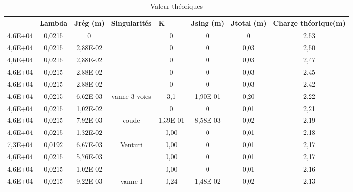 \documentclass[12pt, a4paper, twoside]{article} %
\begin{document}
\begin{landscape}
\centering
\begin{table}[h]
  \centering
  \caption{Valeur théoriques}
    \begin{tabular}{|c|c|c|c|c|c|c|c|}
    \hline
   \rowcolor[rgb]{ 1,  1,  0} \multicolumn{1}{|l|}{Re} & \multicolumn{1}{l|}{Lambda} & \multicolumn{1}{l|}{Jrég (m)} & Singularités & \multicolumn{1}{l|}{K} & \multicolumn{1}{l|}{Jsing (m)} & \multicolumn{1}{l|}{Jtotal (m)} & \multicolumn{1}{l|}{Charge théorique(m)} \\
    \hline
    4,6E+04 & 0,0215 & 0      & \cellcolor[rgb]{ .576,  .769,  .49} & 0      & 0      & 0      & 2,53 \\
    \hline
    4,6E+04 & 0,0215 & 2,88E-02 & \cellcolor[rgb]{ .576,  .769,  .49} & 0      & 0      & 0,03   & 2,50 \\
    \hline
    4,6E+04 & 0,0215 & 2,88E-02 & \cellcolor[rgb]{ .576,  .769,  .49} & 0      & 0      & 0,03   & 2,47 \\
    \hline
    4,6E+04 & 0,0215 & 2,88E-02 & \cellcolor[rgb]{ .576,  .769,  .49} & 0      & 0      & 0,03   & 2,45 \\
    \hline
    4,6E+04 & 0,0215 & 2,88E-02 & \cellcolor[rgb]{ .576,  .769,  .49} & 0      & 0      & 0,03   & 2,42 \\
    \hline
    4,6E+04 & 0,0215 & 6,62E-03 & \cellcolor[rgb]{ .576,  .769,  .49}vanne 3 voies & 3,1    & 1,90E-01 & 0,20   & 2,22 \\
    \hline
    4,6E+04 & 0,0215 & 1,02E-02 & \cellcolor[rgb]{ .576,  .769,  .49} & 0      & 0      & 0,01   & 2,21 \\
    \hline
    4,6E+04 & 0,0215 & 7,92E-03 & \cellcolor[rgb]{ .576,  .769,  .49}coude & 1,39E-01 & 8,58E-03 & 0,02   & 2,19 \\
    \hline
    4,6E+04 & 0,0215 & 1,32E-02 & \cellcolor[rgb]{ .576,  .769,  .49} & 0,00   & 0      & 0,01   & 2,18 \\
    \hline
    7,3E+04 & 0,0192 & 6,67E-03 & \cellcolor[rgb]{ .576,  .769,  .49}Venturi & 0,00   & 0      & 0,01   & 2,17 \\
    \hline
    4,6E+04 & 0,0215 & 5,76E-03 & \cellcolor[rgb]{ .576,  .769,  .49} & 0,00   & 0      & 0,01   & 2,17 \\
    \hline
    4,6E+04 & 0,0215 & 1,02E-02 & \cellcolor[rgb]{ .576,  .769,  .49} & 0,00   & 0      & 0,01   & 2,16 \\
    \hline
    4,6E+04 & 0,0215 & 9,22E-03 & \cellcolor[rgb]{ .576,  .769,  .49}vanne I & 0,24   & 1,48E-02 & 0,02   & 2,13 \\

\end{tabular}
\end{table}
\end{landscape}
\end{document}
